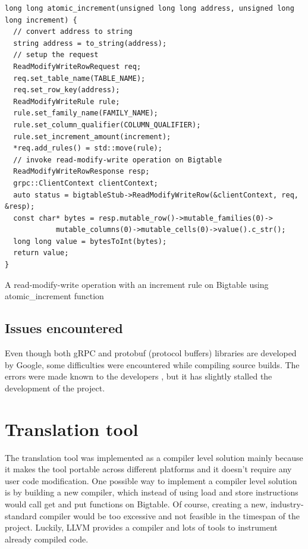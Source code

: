 \documentclass[bsc,frontabs,twoside,singlespacing,parskip,deptreport]{infthesis}     %
\begin{document}
\begin{listing}[H]
\begin{verbatim}
long long atomic_increment(unsigned long long address, unsigned long long increment) {
  // convert address to string
  string address = to_string(address);
  // setup the request
  ReadModifyWriteRowRequest req;
  req.set_table_name(TABLE_NAME);
  req.set_row_key(address);
  ReadModifyWriteRule rule;
  rule.set_family_name(FAMILY_NAME);
  rule.set_column_qualifier(COLUMN_QUALIFIER);
  rule.set_increment_amount(increment);
  *req.add_rules() = std::move(rule);
  // invoke read-modify-write operation on Bigtable
  ReadModifyWriteRowResponse resp;
  grpc::ClientContext clientContext;
  auto status = bigtableStub->ReadModifyWriteRow(&clientContext, req, &resp);
  const char* bytes = resp.mutable_row()->mutable_families(0)->
  			mutable_columns(0)->mutable_cells(0)->value().c_str();
  long long value = bytesToInt(bytes);
  return value;
}
\end{verbatim}
\caption{A read-modify-write operation with an increment rule on Bigtable using atomic\_increment function}
\label{get}
\end{listing}

\section{Issues encountered}

Even though both gRPC and protobuf (protocol buffers) libraries are developed by Google, some difficulties were encountered while compiling source builds. The errors were made known to the developers \citep{grpc_issue}, but it has slightly stalled the development of the project.









\chapter{Translation tool}
\label{translation-tool}

The translation tool was implemented as a compiler level solution mainly because it makes the tool portable across different platforms and it doesn't require any user code modification. One possible way to implement a compiler level solution is by building a new compiler, which instead of using load and store instructions would call get and put functions on Bigtable. Of course, creating a new, industry-standard compiler would be too excessive and not feasible in the timespan of the project. Luckily, LLVM provides a compiler and lots of tools to instrument already compiled code.
\end{document}
